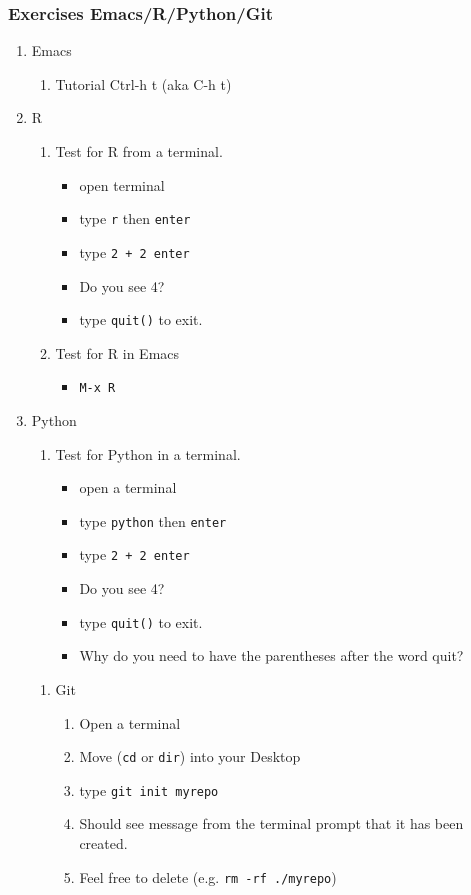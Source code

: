 \documentclass{article}
\begin{document}
\subsubsection{Exercises Emacs/R/Python/Git}
\label{sec:org9da99a3}
\begin{enumerate}
\item Emacs
\label{sec:org8c307f6}
\begin{enumerate}
\item Tutorial Ctrl-h t (aka C-h t)
\end{enumerate}
\item R
\label{sec:org1cc09dd}
\begin{enumerate}
\item Test for R from a terminal.
\begin{itemize}
\item open terminal
\item type \texttt{r} then \texttt{enter}
\item type \texttt{2 + 2 enter}
\item Do you see 4?
\item type \texttt{quit()} to exit.
\end{itemize}
\item Test for R in Emacs
\begin{itemize}
\item \texttt{M-x R}
\end{itemize}
\end{enumerate}
\item Python
\label{sec:orgbcc6318}
\begin{enumerate}
\item Test for Python in a terminal.
\begin{itemize}
\item open a terminal
\item type \texttt{python} then \texttt{enter}
\item type \texttt{2 + 2 enter}
\item Do you see 4?
\item type \texttt{quit()} to exit.
\item Why do you need to have the parentheses after the word quit?
\end{itemize}
\end{enumerate}
\begin{enumerate}
\item Git
\label{sec:org517dbc8}
\begin{enumerate}
\item Open a terminal
\item Move (\texttt{cd} or \texttt{dir}) into your Desktop
\item type \texttt{git init myrepo}
\item Should see message from the terminal prompt that it has been created.
\item Feel free to delete (e.g. \texttt{rm -rf ./myrepo})
\end{enumerate}
\end{enumerate}
\end{enumerate}
\end{document}

